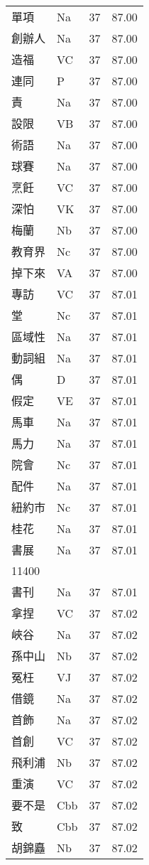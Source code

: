 \documentclass[twocolumn]{book}
\begin{document}
\begin{supertabular}{llrr}
單項 & Na & 37 &  87.00\\
創辦人 & Na & 37 &  87.00\\
造福 & VC & 37 &  87.00\\
連同 & P & 37 &  87.00\\
責 & Na & 37 &  87.00\\
設限 & VB & 37 &  87.00\\
術語 & Na & 37 &  87.00\\
球賽 & Na & 37 &  87.00\\
烹飪 & VC & 37 &  87.00\\
深怕 & VK & 37 &  87.00\\
梅蘭 & Nb & 37 &  87.00\\
教育界 & Nc & 37 &  87.00\\
掉下來 & VA & 37 &  87.00\\
專訪 & VC & 37 &  87.01\\
堂 & Nc & 37 &  87.01\\
區域性 & Na & 37 &  87.01\\
動詞組 & Na & 37 &  87.01\\
偶 & D & 37 &  87.01\\
假定 & VE & 37 &  87.01\\
馬車 & Na & 37 &  87.01\\
馬力 & Na & 37 &  87.01\\
院會 & Nc & 37 &  87.01\\
配件 & Na & 37 &  87.01\\
紐約市 & Nc & 37 &  87.01\\
桂花 & Na & 37 &  87.01\\
書展 & Na & 37 &  87.01\\
11400\\
書刊 & Na & 37 &  87.01\\
拿捏 & VC & 37 &  87.02\\
峽谷 & Na & 37 &  87.02\\
孫中山 & Nb & 37 &  87.02\\
冤枉 & VJ & 37 &  87.02\\
借鏡 & Na & 37 &  87.02\\
首飾 & Na & 37 &  87.02\\
首創 & VC & 37 &  87.02\\
飛利浦 & Nb & 37 &  87.02\\
重演 & VC & 37 &  87.02\\
要不是 & Cbb & 37 &  87.02\\
致 & Cbb & 37 &  87.02\\
胡錦矗 & Nb & 37 &  87.02\\

\end{supertabular}
\end{document}
